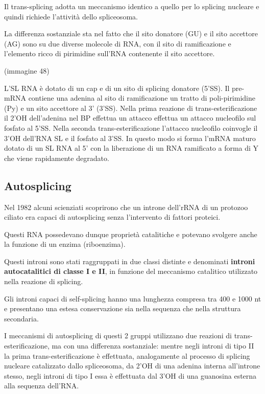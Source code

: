 \documentclass[11pt]{book}
\begin{document}
Il trans-splicing adotta un meccanismo identico a quello per lo splicing
nucleare e quindi richiede l'attività dello spliceosoma.

La differenza sostanziale sta nel fatto che il sito donatore (GU) e il
sito accettore (AG) sono su due diverse molecole di RNA, con il sito di
ramificazione e l'elemento ricco di pirimidine sull'RNA contenente il
sito accettore.

(immagine 48)

L'SL RNA è dotato di un cap e di un sito di splicing donatore (5'SS). Il
pre-mRNA contiene una adenina al sito di ramificazione un tratto di
poli-pirimidine (Py) e un sito accettore al 3' (3'SS). Nella prima
reazione di trans-esterificazione il 2'OH dell'adenina nel BP effettua
un attacco effettua un attacco nucleofilo sul fosfato al 5'SS. Nella
seconda trans-esterificazione l'attacco nucleofilo coinvogle il 3'OH
dell'RNA SL e il fosfato al 3'SS. In questo modo si forma l'mRNA maturo
dotato di un SL RNA al 5' con la liberazione di un RNA ramificato a
forma di Y che viene rapidamente degradato.

\subsection{Autosplicing}\label{autosplicing}

Nel 1982 alcuni scienziati scoprirono che un introne dell'rRNA di un
protozoo ciliato era capaci di autosplicing senza l'intervento di
fattori proteici.

Questi RNA possedevano dunque proprietà catalitiche e potevano svolgere
anche la funzione di un enzima (riboenzima).

Questi introni sono stati raggruppati in due classi distinte e
denominati \textbf{introni autocatalitici di classe I e II}, in funzione
del meccanismo catalitico utilizzato nella reazione di splicing.

Gli introni capaci di self-splicing hanno una lunghezza compresa tra 400
e 1000 nt e presentano una estesa conservazione sia nella sequenza che
nella struttura secondaria.

I meccanismi di autosplicing di questi 2 gruppi utilizzano due reazioni
di trans-esterificazione, ma con una differenza sostanziale: mentre
negli introni di tipo II la prima trans-esterificazione è effettuata,
analogamente al processo di splicing nucleare catalizzato dallo
spliceosoma, da 2'OH di una adenina interna all'introne stesso, negli
introni di tipo I essa è effettuata dal 3'OH di una guanosina esterna
alla sequenza dell'RNA.
\end{document}
